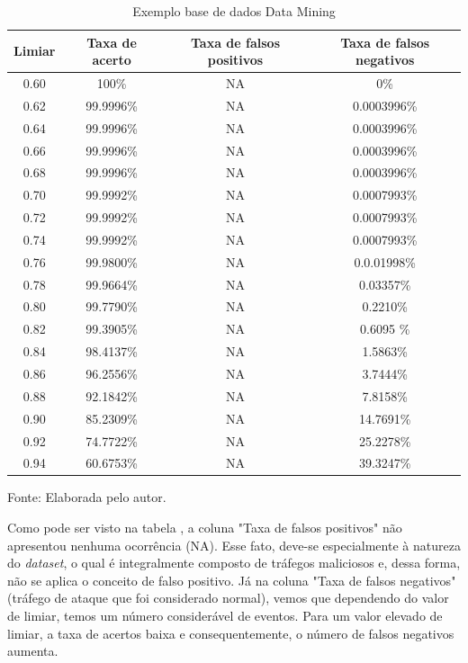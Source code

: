  \begin{table}[htb]
 	\centering
 	\begin{threeparttable}
 		\caption{Exemplo base de dados Data Mining}
 		\label{Tab:ResultsMining}
 		\begin{tabular}{c c c c}
 			\toprule
 			\textbf{Limiar} & \textbf{Taxa de acerto} & \textbf{Taxa de falsos positivos} & \textbf{Taxa de falsos negativos}
 			\\ \midrule
	 			
 			0.60 &  100\% &  NA& 0\%   \\ \midrule
 			0.62 &  99.9996\% &  NA& 0.0003996\%   \\ \midrule
 			0.64 &  99.9996\% &  NA& 0.0003996\%   \\ \midrule
 			0.66 &  99.9996\% &  NA& 0.0003996\%   \\ \midrule
 			0.68 &  99.9996\% &  NA& 0.0003996\%   \\ \midrule
 			0.70 &  99.9992\% &  NA& 0.0007993\%   \\ \midrule
 			0.72 &  99.9992\% &  NA& 0.0007993\%   \\ \midrule
 			0.74 &  99.9992\% &  NA& 0.0007993\%   \\ \midrule
 			0.76 &  99.9800\% &  NA& 0.0.01998\%   \\ \midrule
 			0.78 &  99.9664\% &  NA& 0.03357\%   \\\midrule 		 			 			 			 			 			 			 			
 			0.80 &  99.7790\% &  NA& 0.2210\%   \\ \midrule
 			0.82 &  99.3905\% & NA & 0.6095 \%   \\ \midrule
 			0.84 &  98.4137\%  & NA & 1.5863\%   \\ \midrule
 			0.86 &  96.2556\%  &  NA & 3.7444\%   \\ \midrule
 			0.88 &  92.1842\%  &  NA & 7.8158\%     \\ \midrule
 			0.90 &  85.2309\%  & NA & 14.7691\%    \\ \midrule
 			0.92 &  74.7722\%  &  NA & 25.2278\%   \\ \midrule
 			0.94 &  60.6753\%  & NA & 39.3247\%   \\ \bottomrule
 		\end{tabular}
 		{Fonte: Elaborada pelo autor.}
 	\end{threeparttable}
 \end{table}
Como pode ser visto na tabela , a coluna "Taxa de falsos positivos" não apresentou nenhuma ocorrência (NA). Esse fato, deve-se especialmente à natureza do \textit{dataset}, o qual é integralmente composto de tráfegos maliciosos e, dessa forma, não se aplica o conceito de falso positivo. Já na coluna "Taxa de falsos negativos"   (tráfego de ataque que foi considerado normal), vemos que dependendo do valor de limiar, temos um número considerável de eventos. Para um valor elevado de limiar, a taxa de acertos baixa e consequentemente, o número de falsos negativos aumenta. 
